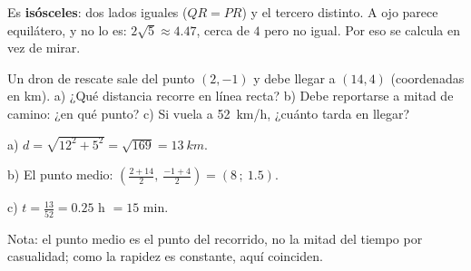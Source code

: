 \documentclass[11pt]{article}
\begin{document}
\begin{preguntas}
\begin{solucion}[5.5cm]
Es \textbf{isósceles}: dos lados iguales ($QR = PR$) y el tercero distinto. A ojo parece
equilátero, y no lo es: $2\sqrt{5} \approx \num{4,47}$, cerca de $4$ pero no igual. Por eso se
calcula en vez de mirar.
\end{solucion}

\pregunta[1] Un dron de rescate sale del punto $(2, -1)$ y debe llegar a $(14, 4)$
(coordenadas en km). a) ¿Qué distancia recorre en línea recta? b) Debe reportarse a mitad de
camino: ¿en qué punto? c) Si vuela a \qty{52}{km/h}, ¿cuánto tarda en llegar?
\begin{solucion}[5cm]
a) $d = \sqrt{12^2 + 5^2} = \sqrt{169} = \qty{13}{km}$.

b) El punto medio: $\left(\frac{2 + 14}{2},\ \frac{-1 + 4}{2}\right) = (8\,;\ \num{1,5})$.

c) $t = \frac{13}{52} = \num{0,25}$ h $= 15$ min.

Nota: el punto medio es el punto del recorrido, no la mitad del tiempo por casualidad; como la
rapidez es constante, aquí coinciden.
\end{solucion}

\end{preguntas}
\end{document}
